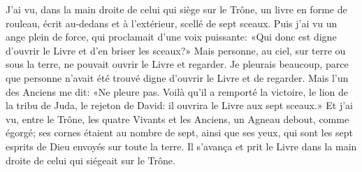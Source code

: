 J’ai vu, dans la main droite de celui qui siège sur le Trône,
	un livre en forme de rouleau, écrit au-dedans et à l’extérieur,
	scellé de sept sceaux.
Puis j’ai vu un ange plein de force, qui proclamait d’une voix puissante:
	«Qui donc est digne d’ouvrir le Livre et d’en briser les sceaux?»
Mais personne, au ciel, sur terre ou sous la terre,
	ne pouvait ouvrir le Livre et regarder.
Je pleurais beaucoup,
	parce que personne n’avait été trouvé digne
		d’ouvrir le Livre et de regarder.
Mais l’un des Anciens me dit: «Ne pleure pas.
Voilà qu’il a remporté la victoire,
	le lion de la tribu de Juda, le rejeton de David:
	il ouvrira le Livre aux sept sceaux.»
Et j’ai vu, entre le Trône, les quatre Vivants et les Anciens,
	un Agneau debout, comme égorgé;
	ses cornes étaient au nombre de sept, ainsi que ses yeux,
	qui sont les sept esprits de Dieu envoyés sur toute la terre.
Il s’avança
	et prit le Livre dans la main droite de celui qui siégeait sur le Trône.
